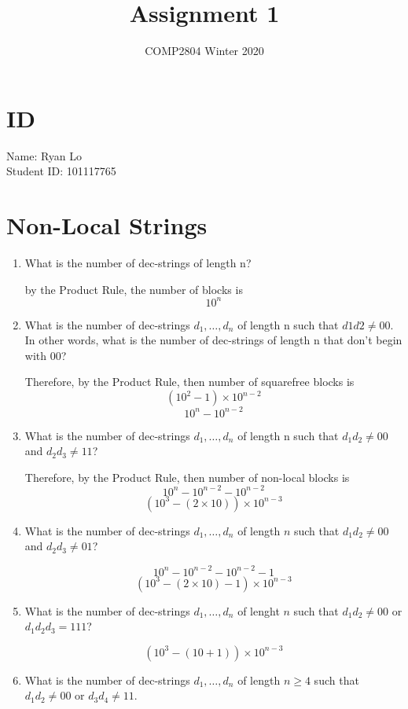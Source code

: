 \documentclass{article}
\title{Assignment 1}
\author{COMP2804 Winter 2020}
\begin{document}
\maketitle

\section{ID}

Name: Ryan Lo \\
Student ID: 101117765

\section{Non-Local Strings}

\begin{enumerate}
   \item What is the number of dec-strings of length n?
  
   by the Product Rule, the number of blocks is
   \[
      10^{n}
   \]

   \item What is the number of dec-strings $d_1,\ldots,d_n$ of length n such that $d1d2\neq00$. In other words, what is the number of dec-strings of length n that don't begin with 00?
 
   Therefore, by the Product Rule, then number of squarefree blocks is 
   \[
      (10^{2}-1) \times 10^{n-2}
   \]
   \[
      10^{n} - 10^{n-2}
   \]
  
   \item What is the number of dec-strings $d_1,\ldots,d_n$ of length n such that $d_1d_2\neq00$ and $d_2d_3\neq11$?
  
   Therefore, by the Product Rule, then number of non-local blocks is 
   \[
      10^{n} - 10^{n-2} - 10^{n-2}
   \]
   \[
      (10^3 - (2 \times 10)) \times 10^{n-3}
   \]  
   \item What is the number of dec-strings $d_1,\ldots,d_n$ of length $n$ such that $d_1d_2\neq00$ and $d_2d_3\neq01$?
   
   \[
      10^{n} - 10^{n-2} - 10^{n-2} - 1
   \]
   \[
      (10^3 - (2 \times 10) - 1) \times 10^{n-3}
   \] 

   \item What is the number of dec-strings $d_1,\ldots,d_n$ of lenght $n$ such that $d_1d_2\neq00$ or $d_1d_2d_3=111$?
 
   \[
      (10^3 - (10 + 1)) \times 10^{n-3}
   \] 
   
   \item What is the number of dec-strings $d_1,\ldots,d_n$ of length $n\geq4$ such that $d_1d_2\neq00$ or $d_3d_4\neq11$.


\end{enumerate}
\end{document}
